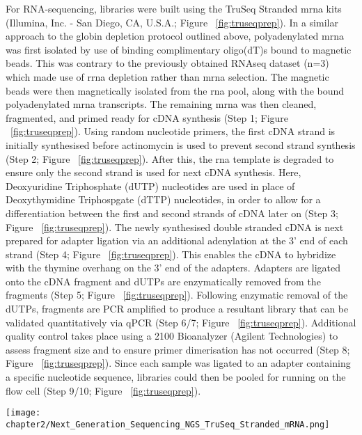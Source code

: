 For RNA-sequencing, libraries were built using the TruSeq Stranded \acrshort{mrna} kits (Illumina, Inc. - San Diego, CA, U.S.A.; Figure ~\ref{fig:truseqprep}). In a similar approach to the globin depletion protocol outlined above, polyadenylated \acrshort{mrna} was first isolated by use of binding complimentary oligo(dT)s bound to magnetic beads. This was contrary to the previously obtained RNAseq dataset (n=3) which made use of \acrshort{rrna} depletion rather than \acrshort{mrna} selection. The magnetic beads were then magnetically isolated from the \acrshort{rna} pool, along with the bound polyadenylated \acrshort{mrna} transcripts. The remaining \acrshort{mrna} was then cleaned, fragmented, and primed ready for cDNA synthesis (Step 1; Figure ~\ref{fig:truseqprep}). Using random nucleotide primers, the first cDNA strand is initially synthesised before actinomycin is used to prevent second strand synthesis (Step 2; Figure ~\ref{fig:truseqprep}). After this, the \acrshort{rna} template is degraded to ensure only the second strand is used for next cDNA synthesis. Here, Deoxyuridine Triphosphate (dUTP) nucleotides are used in place of Deoxythymidine Triphospgate (dTTP) nucleotides, in order to allow for a differentiation between the first and second strands of cDNA later on (Step 3; Figure ~\ref{fig:truseqprep}). The newly synthesised double stranded cDNA is next prepared for adapter ligation via an additional adenylation at the 3' end of each strand (Step 4; Figure ~\ref{fig:truseqprep}). This enables the cDNA to hybridize with the thymine overhang on the 3' end of the adapters. Adapters are ligated onto the cDNA fragment and dUTPs are enzymatically removed from the fragments (Step 5; Figure ~\ref{fig:truseqprep}). Following enzymatic removal of the dUTPs, fragments are PCR amplified to produce a resultant library that can be validated quantitatively via qPCR (Step 6/7; Figure ~\ref{fig:truseqprep}). Additional quality control takes place using a 2100 Bioanalyzer (Agilent Technologies) to assess fragment size and to ensure primer dimerisation has not occurred (Step 8; Figure ~\ref{fig:truseqprep}). Since each sample was ligated to an adapter containing a specific nucleotide sequence, libraries could then be pooled for running on the flow cell (Step 9/10; Figure ~\ref{fig:truseqprep}).

\begin{figure*}[!htbp]
\centering
\texttt{[image: chapter2/Next\_Generation\_Sequencing\_NGS\_TruSeq\_Stranded\_mRNA.png]}
\caption[Overview of TruSeq Stranded mRNA Preparation protocol]{Overview of TruSeq Stranded \acrshort{mrna} Preparation protocol. Image adapted from www.abmgood.com}
\label{fig:truseqprep}
\end{figure*}

